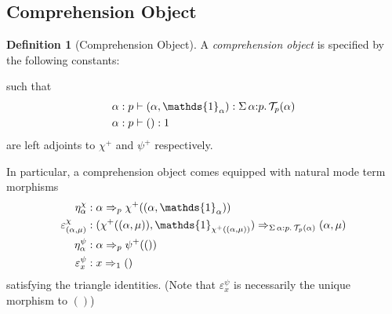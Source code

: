 \documentclass[10pt]{article}
\theoremstyle{definition}
\newtheorem{definition}{Definition}
\newcommand{\yields}{\vdash}
\newcommand{\tcell}{\Rightarrow}
\newcommand{\type}{\,\,\mathsf{mode}}
\newcommand{\sigmacl}[3]{\ensuremath{\textnormal{$\Sigma$}\,#1{:}#2.\,#3}}
\newcommand\TypeTwo[4]{\ensuremath{#1 \vdash #2 :  #3 \tcell #4}}
\newcommand\TrPlus[2]{\ensuremath{{#1}^+(#2)}}
\newcommand\El[2]{\mathcal{T}_{#1}(#2)}
\newcommand\One{\ensuremath{\mathds{1}}}
\begin{document}
\subsection{Comprehension Object}

\begin{definition}[Comprehension Object]\label{def:comprehension-object}
  A \emph{comprehension object} is specified by the following
  constants:
  such that
\begin{align*}
\alpha : p &\yields (\alpha, \One_\alpha) : \sigmacl{\alpha}{p}{\El{p}{\alpha}} \\
\alpha : p &\yields () : 1
\end{align*}
are left adjoints to $\chi^+$ and $\psi^+$ respectively.
\end{definition}

In particular, a comprehension object comes equipped with natural mode term morphisms
\begin{align*}
\eta^\chi_\alpha {}&: \alpha \tcell_p \TrPlus{\chi}{(\alpha, \One_\alpha)} \\
\varepsilon^\chi_{(\alpha, \mu)} {}&: (\TrPlus{\chi}{(\alpha, \mu)}, \One_{\TrPlus{\chi}{(\alpha, \mu)}}) \tcell_{\sigmacl{\alpha}{p}{\El{p}{\alpha}}} (\alpha, \mu) \\
\eta^\psi_\alpha {}&: \alpha \tcell_p \TrPlus{\psi}{()} \\
\varepsilon^\psi_{x} {}&: x \tcell_1 ()
\end{align*}
satisfying the triangle identities. (Note that $\varepsilon^\psi_x$ is necessarily the unique morphism to $()$)
\end{document}
